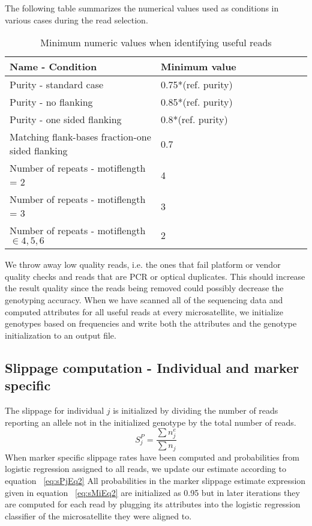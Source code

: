 \documentclass{bioinfo}
\begin{document}
    The following table summarizes the numerical values used as conditions in various cases during the read selection.
    \begin{center}
        \begin{table}[H]
            \caption{Minimum numeric values when identifying useful reads}
            \begin{tabular}{p{0.5\linewidth}|p{0.5\linewidth}}
                \hline
                \textbf{Name - Condition} & \textbf{Minimum value} \\ \hline
                Purity - standard case & 0.75*(ref. purity) \\ \hline
                Purity - no flanking & 0.85*(ref. purity) \\ \hline
                Purity - one sided flanking & 0.8*(ref. purity) \\ \hline
                Matching flank-bases fraction-one sided flanking & 0.7 \\ \hline
                Number of repeats - motiflength = 2 & 4 \\ \hline
                Number of repeats - motiflength = 3 & 3 \\ \hline
                Number of repeats - motiflength $\in {4,5,6}$ &  2\\ 
                \hline
            \end{tabular}
            \label{table:numConditions}
        \end{table}
    \end{center}
    
    We throw away low quality reads, i.e. the ones that fail platform or vendor quality checks and reads that are PCR or optical duplicates. This should increase the result quality since the reads being removed could possibly decrease the genotyping accuracy.
    When we have scanned all of the sequencing data and computed attributes for all useful reads at every microsatellite, we initialize genotypes based on frequencies and write both the attributes and the genotype initialization to an output file.
\subsection{Slippage computation - Individual and marker specific}
    The slippage for individual $j$ is initialized by dividing the number of reads reporting an allele not in the initialized genotype by the total number of reads.
    \begin{equation}
            S^{P}_j = \frac{\sum n^e_j}{\sum n_j}
    \end{equation}
    When marker specific slippage rates have been computed and probabilities from logistic regression assigned to all reads, we update our estimate according to equation ~\ref{eq:sPjEq2}
    All probabilities in the marker slippage estimate expression given in equation ~\ref{eq:sMiEq2} are initialized as 0.95 but in later iterations they are computed for each read by plugging its attributes into the logistic regression classifier of the microsatellite they were aligned to.
\end{document}
